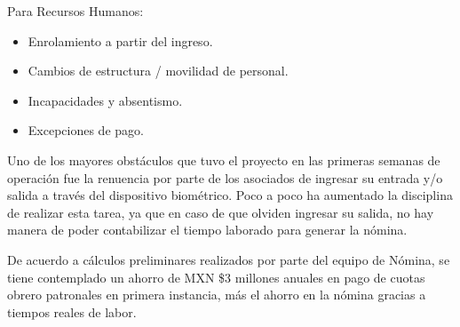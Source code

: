 Para Recursos Humanos:

\begin{itemize}
 \item Enrolamiento a partir del ingreso.
 \item Cambios de estructura / movilidad de personal.
 \item Incapacidades y absentismo.
 \item Excepciones de pago.
\end{itemize}

Uno de los mayores obstáculos que tuvo el proyecto en las primeras semanas de operación fue la renuencia por parte de los asociados de ingresar su entrada y/o salida a través del dispositivo biométrico. Poco a poco ha aumentado la disciplina de realizar esta tarea, ya que en caso de que olviden ingresar su salida, no hay manera de poder contabilizar el tiempo laborado para generar la nómina.

De acuerdo a cálculos preliminares realizados por parte del equipo de Nómina, se tiene contemplado un ahorro de MXN \$3 millones anuales en pago de cuotas obrero patronales en primera instancia, más el ahorro en la nómina gracias a tiempos reales de labor.

